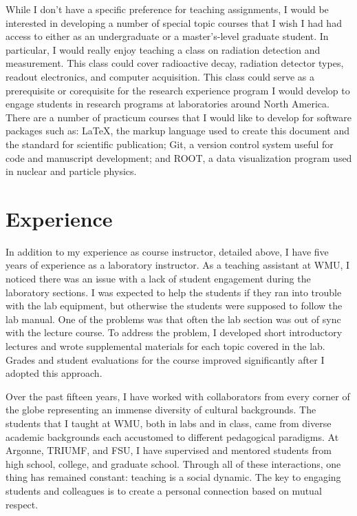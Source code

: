 {While I don't have a specific preference for teaching assignments, 
I would be interested in developing a number of special topic courses that I wish I had had access to either as an undergraduate or a master's-level graduate student. In particular, I would really enjoy teaching a class on radiation detection and measurement. This class could cover radioactive decay, radiation detector types, readout electronics, and computer acquisition. This class could serve as a prerequisite or corequisite for the research experience program I would develop to engage students in research programs at laboratories around North America.
There are a number of practicum courses 
that I would like to %
develop for software packages such as: %
\LaTeX, the markup language used to create this document and the standard for scientific publication; Git, a version control system useful for code and manuscript development; and ROOT, a data visualization program used in nuclear and particle physics.

\def\secname{Experience}
\section*{\hspace{-\parindent}\secname}
\addcontentsline{toc}{section}{\secname}%
In addition to my experience as course instructor, detailed above, I have five years of experience as a laboratory instructor. As a teaching assistant at WMU, I noticed there  was an issue with a lack of student engagement during the laboratory sections. I was expected to help the students if they ran into trouble with the lab equipment, but otherwise the students were supposed to follow the lab manual. One of the problems was that often the lab section was out of sync with the lecture course. To address the problem, I developed short introductory lectures and wrote supplemental materials for each topic covered in the lab. Grades and student evaluations for the course improved significantly after I adopted this approach.

Over the past fifteen years, I have worked with collaborators from every corner of the globe representing an immense diversity of cultural backgrounds.
The students that I taught at WMU, both in labs and in class, came from diverse academic backgrounds each accustomed to different pedagogical paradigms.
At Argonne, TRIUMF, and FSU, I have supervised and mentored students from high school, college, and graduate school.
Through all of these interactions, one thing has remained constant: teaching is a social dynamic. The key to engaging students and colleagues is to create a personal connection based on mutual respect.

%
}